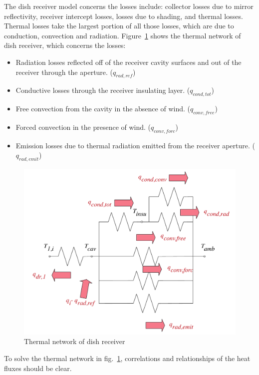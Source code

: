 The dish receiver model concerns the losses include: collector losses due to mirror reflectivity, receiver intercept losses, losses due to shading, and thermal losses. Thermal losses take the largest portion of all those losses, which are due to conduction, convection and radiation. Figure~\ref{fig:thermal-lose} shows the thermal network of dish receiver, which concerns the losses:
\begin{itemize}
	\item Radiation losses reflected off of the receiver cavity surfaces and out of the receiver through the aperture. ($q_{rad,ref}$)
	\item Conductive losses through the receiver insulating layer. ($q_{cond,tot}$)
	\item Free convection from the cavity in the absence of wind. ($q_{conv,free}$)
	\item Forced convection in the presence of wind. ($q_{conv,forc}$)
	\item Emission losses due to thermal radiation emitted from the receiver aperture. ($q_{rad,emit}$)
\end{itemize}

\noindent \begin{figure}[htbp]
\begin{center}
	\includegraphics[width = 0.7\columnwidth]{fig/thermalLosses.pdf}
	\caption{Thermal network of dish receiver}
	\label{fig:thermal-lose}
\end{center}
\end{figure}

To solve the thermal network in fig.~\ref{fig:thermal-lose}, correlations and relationships of the heat fluxes should be clear.

